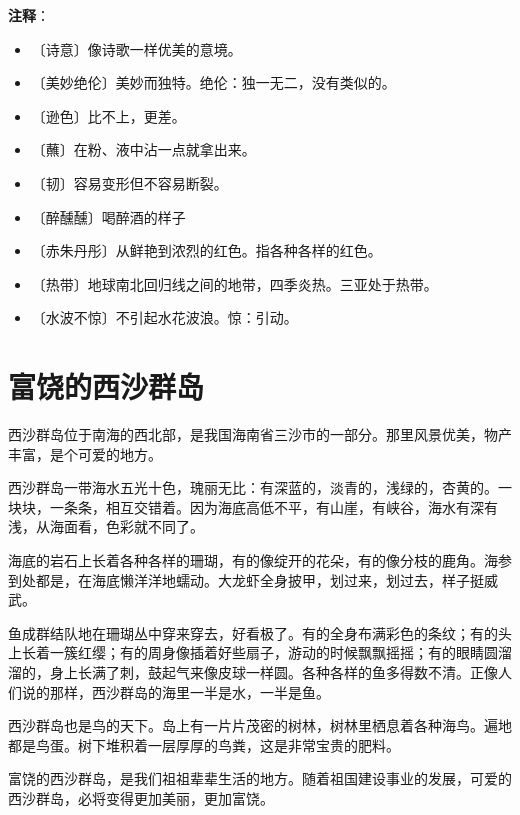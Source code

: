 \documentclass[12pt,UTF-8,openany]{ctexbook}
\begin{document}
\newpage

\textbf{注释}：

\vspace{-1em}

\begin{itemize}
    \setlength\itemsep{-0.2em}
    \item 〔诗意〕像诗歌一样优美的意境。
    \item 〔美妙绝伦〕美妙而独特。绝伦：独一无二，没有类似的。
    \item 〔逊色〕比不上，更差。
    \item 〔蘸〕在粉、液中沾一点就拿出来。
    \item 〔韧〕容易变形但不容易断裂。
    \item 〔醉醺醺〕喝醉酒的样子
    \item 〔赤朱丹彤〕从鲜艳到浓烈的红色。指各种各样的红色。
    \item 〔热带〕地球南北回归线之间的地带，四季炎热。三亚处于热带。
    \item 〔水波不惊〕不引起水花波浪。惊：引动。
\end{itemize}

\chapter{富饶的西沙群岛}

\begin{Large}
    
    西沙群岛位于南海的西北部，是我国海南省三沙市的一部分。那里风景优美，物产丰富，是个可爱的地方。
    
    西沙群岛一带海水五光十色，瑰丽无比：有深蓝的，淡青的，浅绿的，杏黄的。一块块，一条条，相互交错着。因为海底高低不平，有山崖，有峡谷，海水有深有浅，从海面看，色彩就不同了。
    
    海底的岩石上长着各种各样的珊瑚，有的像绽开的花朵，有的像分枝的鹿角。海参到处都是，在海底懒洋洋地蠕动。大龙虾全身披甲，划过来，划过去，样子挺威武。
    
    鱼成群结队地在珊瑚丛中穿来穿去，好看极了。有的全身布满彩色的条纹；有的头上长着一簇红缨；有的周身像插着好些扇子，游动的时候飘飘摇摇；有的眼睛圆溜溜的，身上长满了刺，鼓起气来像皮球一样圆。各种各样的鱼多得数不清。正像人们说的那样，西沙群岛的海里一半是水，一半是鱼。
    
    西沙群岛也是鸟的天下。岛上有一片片茂密的树林，树林里栖息着各种海鸟。遍地都是鸟蛋。树下堆积着一层厚厚的鸟粪，这是非常宝贵的肥料。
    
    富饶的西沙群岛，是我们祖祖辈辈生活的地方。随着祖国建设事业的发展，可爱的西沙群岛，必将变得更加美丽，更加富饶。
    
\end{Large}
\end{document}
